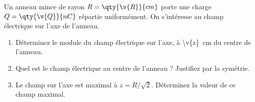 Un anneau mince de rayon $R = \qty{\v{R}}{cm}$ porte une charge $Q = \qty{\v{Q}}{nC}$ répartie uniformément. On s'intéresse au champ électrique sur l'axe de l'anneau.

\begin{enumerate}[label=\alph*)]
    \item Déterminez le module du champ électrique sur l'axe, à \qty{\v{z}}{cm} du centre de l'anneau.
    \item Quel est le champ électrique au centre de l'anneau ? Justifiez par la symétrie.
    \item Le champ sur l'axe est maximal à $z = R/\sqrt{2}$. Déterminez la valeur de ce champ maximal.
\end{enumerate}
